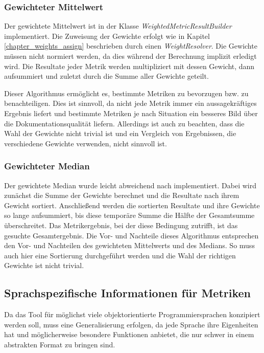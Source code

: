 \subsubsection{Gewichteter Mittelwert}
Der gewichtete Mittelwert ist in der Klasse \textit{WeightedMetricResultBuilder} implementiert. Die Zuweisung der Gewichte erfolgt wie in Kapitel \ref{chapter_weights_assign} beschrieben durch einen \textit{WeightResolver}. Die Gewichte müssen nicht normiert werden, da dies während der Berechnung implizit erledigt wird. Die Resultate jeder Metrik werden multipliziert mit dessen Gewicht, dann aufsummiert und zuletzt durch die Summe aller Gewichte geteilt. 


Dieser Algorithmus ermöglicht es, bestimmte Metriken zu bevorzugen bzw. zu benachteiligen. Dies ist sinnvoll, da nicht jede Metrik immer ein aussagekräftiges Ergebnis liefert und bestimmte Metriken je nach Situation ein besseres Bild über die Dokumentationsqualität liefern. Allerdings ist auch zu beachten, dass die Wahl der Gewichte nicht trivial ist und ein Vergleich von Ergebnissen, die verschiedene Gewichte verwenden, nicht sinnvoll ist.

\subsubsection{Gewichteter Median}
Der gewichtete Median wurde leicht abweichend nach \cite[S. 37]{YAGER199835} implementiert. Dabei wird zunächst die Summe der Gewichte berechnet und die Resultate nach ihrem Gewicht sortiert. Anschließend werden die sortierten Resultate und ihre Gewichte so lange aufsummiert, bis diese temporäre Summe die Hälfte der Gesamtsumme überschreitet. Das Metrikergebnis, bei der diese Bedingung zutrifft, ist das gesuchte Gesamtergebnis. Die Vor- und Nachteile dieses Algorithmus entsprechen den Vor- und Nachteilen des gewichteten Mittelwerts und des Medians. So muss auch hier eine Sortierung durchgeführt werden und die Wahl der richtigen Gewichte ist nicht trivial. 
\subsection{Sprachspezifische Informationen für Metriken}
Da das Tool für möglichst viele objektorientierte Programmiersprachen konzipiert werden soll, muss eine Generalisierung erfolgen, da jede Sprache ihre Eigenheiten hat und möglicherweise besondere Funktionen anbietet, die nur schwer in einem abstrakten Format zu bringen sind.

